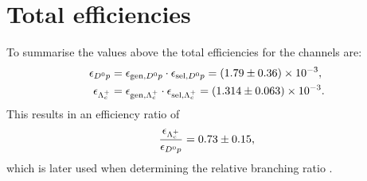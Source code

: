 \section{Total efficiencies}
To summarise the values above the total efficiencies for the channels are:
\begin{align*}
    \effDp &= \effGenDp \cdot \effSelDp = \num[scientific-notation=true]{\effDpval \pm \effDperr}, \\
    \effLc &= \effGenLc \cdot \effSelLc = \num[scientific-notation=true]{\effLcval \pm \effLcerr}.
\end{align*}
This results in an efficiency ratio of
\begin{align*}
    \frac{\effLc}{\effDp} = \effRatioval \pm \effRatioerr,
\end{align*}
which is later used when determining the relative branching ratio \R.
